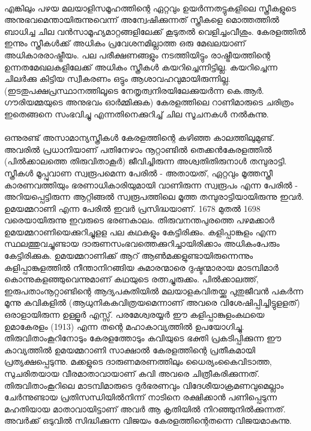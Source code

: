 \paragraph{}എങ്കിലും പഴയ മലയാളിസമൂഹത്തിന്റെ ഏറ്റവും ഉയർന്നതട്ടുകളിലെ സ്ത്രീകളുടെ അനുഭവമെന്തായിരുന്നുവെന്ന് അന്വേഷിക്കുന്നത് സ്ത്രീകളെ മൊത്തത്തിൽ ബാധിച്ച ചില വൻസാമൂഹ്യമാറ്റങ്ങളിലേക്ക് കൂടുതൽ വെളിച്ചംവീശും. കേരളത്തിൽ ഇന്നും സ്ത്രീകൾക്ക് അധികം പ്രവേശനമില്ലാത്ത ഒരു മേഖലയാണ് അധികാരരാഷ്ട്രീയം. പല പരീക്ഷണങ്ങളും നടത്തിയിട്ടും രാഷ്ട്രീയത്തിന്റെ ഉന്നതമേഖലകളിലേക്ക് അധികം സ്ത്രീകൾ കയറിച്ചെന്നിട്ടില്ല. കയറിച്ചെന്ന ചിലർക്കു കിട്ടിയ സ്വീകരണം ഒട്ടും ആശാവഹവുമായിരുന്നില്ല. (ഇടതുപക്ഷപ്രസ്ഥാനത്തിലൂടെ നേതൃത്വനിരയിലേക്കുയർന്ന കെ.ആർ. ഗൗരിയമ്മയുടെ അനുഭവം ഓർമ്മിക്കുക) കേരളത്തിലെ റാണിമാരുടെ ചരിത്രം ഇതെങ്ങനെ സംഭവിച്ചു എന്നതിനെക്കുറിച്ച് ചില സൂചനകൾ നൽകുന്നു.
\paragraph{}ഒന്നുരണ്ട് അസാമാന്യസ്ത്രീകൾ കേരളത്തിന്റെ കഴിഞ്ഞ കാലത്തിലുമുണ്ട്. അവരിൽ പ്രധാനിയാണ് പതിനേഴാം നൂറ്റാണ്ടിൽ തെക്കൻകേരളത്തിൽ (പിൽക്കാലത്തെ തിരുവിതാകൂർ) ജീവിച്ചിരുന്ന അശ്വതിതിരുനാൾ തമ്പുരാട്ടി. സ്ത്രീകൾ മൂപ്പുവാണ സ്വരൂപമെന്ന പേരിൽ - അതായത്, ഏറ്റവും മൂത്തസ്ത്രീ കാരണവത്തിയും ഭരണാധികാരിയുമായി വാണിരുന്ന സ്വരൂപം എന്ന പേരിൽ - അറിയപ്പെട്ടിരുന്ന ആറ്റിങ്ങൽ സ്വരൂപത്തിലെ മൂത്ത തമ്പുരാട്ടിയായിരുന്നു ഇവർ. ഉമയമ്മറാണി എന്ന പേരിൽ ഇവർ പ്രസിദ്ധയാണ്. 1678 മുതൽ 1698 വരെയായിരുന്നു ഇവരുടെ ഭരണകാലം. തിരുവനന്തപുരത്തെ പഴമക്കാർ ഉമയമ്മറാണിയെക്കുറിച്ചുളള പല കഥകളും കേട്ടിരിക്കും. കളിപ്പാങ്കുളം എന്ന സ്ഥലത്തുവച്ചുണ്ടായ ദാരുണസംഭവത്തെക്കുറിച്ചായിരിക്കാം അധികംപേരും കേട്ടിരിക്കുക. ഉമയമ്മറാണിക്ക് ആറ് ആൺമക്കളുണ്ടായിരുന്നെന്നും കളിപ്പാങ്കുളത്തിൽ നീന്താനിറങ്ങിയ കുമാരന്മാരെ ദുഷ്ടന്മാരായ മാടമ്പിമാർ കൊന്നുകളഞ്ഞുവെന്നുമാണ് കഥയുടെ രത്നച്ചുരുക്കം. പിൽക്കാലത്ത്, ഇരുപതാംനൂറ്റാണ്ടിന്റെ ആദ്യപകുതിയിൽ മലയാളകവിതയ്ക്കു പുതുജീവൻ പകർന്ന മൂന്നു കവികളിൽ (ആധുനികകവിത്രയമെന്നാണ് അവരെ വിശേഷിപ്പിച്ചിട്ടുളളത്) ഒരാളായിരുന്ന ഉള്ളൂർ എസ്സ്. പരമേശ്വരയ്യർ ഈ കളിപ്പാങ്കുളംകഥയെ ഉമാകേരളം (1913) എന്ന തന്റെ മഹാകാവ്യത്തിൽ ഉപയോഗിച്ചു. തിരുവിതാംകൂറിനോടും കേരളത്തോടും കവിയുടെ ഭക്തി പ്രകടിപ്പിക്കുന്ന ഈ കാവ്യത്തിൽ ഉമയമ്മറാണി സാക്ഷാൽ കേരളത്തിന്റെ പ്രതീകമായി പ്രത്യക്ഷപ്പെടുന്നു. മക്കളുടെ ദാരുണമരണത്തിലും ധൈര്യംകൈവിടാത്ത, സുചരിതയായ വീരമാതാവായാണ് കവി അവരെ ചിത്രീകരിക്കുന്നത്. തിരുവിതാംകൂറിലെ മാടമ്പിമാരുടെ ദുർഭരണവും വിദേശീയാക്രമണവുമെല്ലാം ചേർന്നുണ്ടായ പ്രതിസന്ധിയിൽനിന്ന് നാടിനെ രക്ഷിക്കാൻ പണിപ്പെടുന്ന മഹതിയായ മാതാവായിട്ടാണ് അവർ ആ കൃതിയിൽ നിറഞ്ഞുനിൽക്കുന്നത്. അവർക്ക് ഒടുവിൽ സിദ്ധിക്കുന്ന വിജയം കേരളത്തിന്റെതന്നെ വിജയമാകുന്നു.
